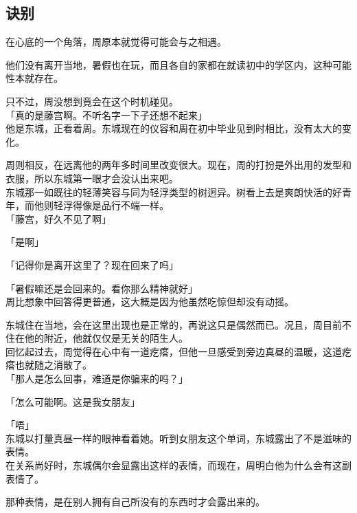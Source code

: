 \subsection{诀别}

在心底的一个角落，周原本就觉得可能会与之相遇。

他们没有离开当地，暑假也在玩，而且各自的家都在就读初中的学区内，这种可能性本就存在。

只不过，周没想到竟会在这个时机碰见。\\

「真的是藤宫啊。不听名字一下子还想不起来」\\

他是东城，正看着周。东城现在的仪容和周在初中毕业见到时相比，没有太大的变化。

周则相反，在远离他的两年多时间里改变很大。现在，周的打扮是外出用的发型和衣服，所以东城第一眼才会没认出来吧。\\

东城那一如既往的轻薄笑容与同为轻浮类型的树迥异。树看上去是爽朗快活的好青年，而他则轻浮得像是品行不端一样。\\

「藤宫，好久不见了啊」

「是啊」

「记得你是离开这里了？现在回来了吗」

「暑假嘛还是会回来的。看你那么精神就好」\\

周比想象中回答得更普通，这大概是因为他虽然吃惊但却没有动摇。

东城住在当地，会在这里出现也是正常的，再说这只是偶然而已。况且，周目前不住在他的附近，他就仅仅是无关的陌生人。\\

回忆起过去，周觉得在心中有一道疙瘩，但他一旦感受到旁边真昼的温暖，这道疙瘩也就随之消散了。\\

「那人是怎么回事，难道是你骗来的吗？」

「怎么可能啊。这是我女朋友」

「唔」\\

东城以打量真昼一样的眼神看着她。听到女朋友这个单词，东城露出了不是滋味的表情。\\

在关系尚好时，东城偶尔会显露出这样的表情，而现在，周明白他为什么会有这副表情了。

那种表情，是在别人拥有自己所没有的东西时才会露出来的。\\

